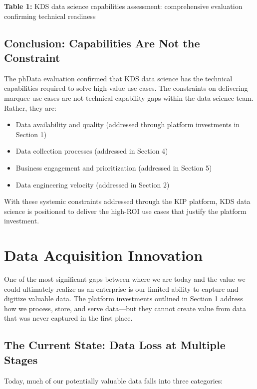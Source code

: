 \documentclass[12pt, a4paper]{article}
\begin{document}
\vspace{0.5em}
\noindent\textbf{Table 1:} KDS data science capabilities assessment: comprehensive evaluation confirming technical readiness
\vspace{1em}

\subsection{Conclusion: Capabilities Are Not the Constraint}

The phData evaluation confirmed that KDS data science has the technical capabilities required to solve high-value use cases. The constraints on delivering marquee use cases are not technical capability gaps within the data science team. Rather, they are:

\begin{itemize}[leftmargin=*, nosep]
    \item Data availability and quality (addressed through platform investments in Section 1)
    \item Data collection processes (addressed in Section 4)
    \item Business engagement and prioritization (addressed in Section 5)
    \item Data engineering velocity (addressed in Section 2)
\end{itemize}

With these systemic constraints addressed through the KIP platform, KDS data science is positioned to deliver the high-ROI use cases that justify the platform investment.

\section{Data Acquisition Innovation}

One of the most significant gaps between where we are today and the value we could ultimately realize as an enterprise is our limited ability to capture and digitize valuable data. The platform investments outlined in Section 1 address how we process, store, and serve data—but they cannot create value from data that was never captured in the first place.

\subsection{The Current State: Data Loss at Multiple Stages}

Today, much of our potentially valuable data falls into three categories:
\end{document}
